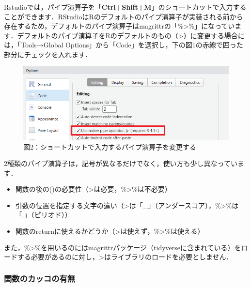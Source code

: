 \documentclass[
  letterpaper,
  DIV=11,
  numbers=noendperiod]{scrreprt}
\providecommand{\tightlist}{%
  \setlength{\itemsep}{0pt}\setlength{\parskip}{0pt}}\usepackage{longtable,booktabs,array}
\begin{document}
Rstudioでは，パイプ演算子を「\textbf{Ctrl+Shift+M}」のショートカットで入力することができます．RStudioはRのデフォルトのパイプ演算子が実装される前から存在するため，デフォルトのパイプ演算子はmagrittrの「\%\textgreater\%」になっています．デフォルトのパイプ演算子をRのデフォルトのもの（\textbar\textgreater）に変更する場合には，「Tools→Global
Options」から「Code」を選択し，下の図1の赤線で囲った部分にチェックを入れます．

\begin{figure}

{\centering \includegraphics{././image/chapter16_pipe_shortcut.png}

}

\caption{図2：ショートカットで入力するパイプ演算子を変更する}

\end{figure}

2種類のパイプ演算子は，記号が異なるだけでなく，使い方も少し異なっています．

\begin{itemize}
\tightlist
\item
  関数の後の()の必要性（\textbar\textgreater は必要，\%\textgreater\%は不必要）
\item
  引数の位置を指定する文字の違い（\textbar\textgreater は「\_」（アンダースコア），\%\textgreater\%は「.」（ピリオド））
\item
  関数のreturnに使えるかどうか（\textbar\textgreater は使えず，\%\textgreater\%は使える）
\end{itemize}

また，\%\textgreater\%を用いるのにはmagrittrパッケージ（tidyverseに含まれている）をロードする必要があるのに対し，\textbar\textgreater はライブラリのロードを必要としません．

\hypertarget{ux95a2ux6570ux306eux30abux30c3ux30b3ux306eux6709ux7121}{%
\subsubsection{関数のカッコの有無}\label{ux95a2ux6570ux306eux30abux30c3ux30b3ux306eux6709ux7121}}
\end{document}
